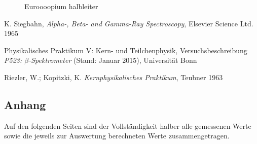 \documentclass[11pt, a4paper]{article}
\numberwithin{equation}{section}
\begin{document}
\begin{figure}[h]
	\centering
	
	\caption{Euroooopium halbleiter}
	\label{fig:halb_europium_spektrum}
\end{figure}

\FloatBarrier
\vspace{\fill}
\begin{thebibliography}{19}
	K. Siegbahn,
	\emph{Alpha-, Beta- and Gamma-Ray Spectroscopy},
	Elsevier Science Ltd. 1965

	Physikalisches Praktikum V: Kern- und Teilchenphysik,
	Versuchsbeschreibung \emph{P523: $\beta$-Spektrometer} (Stand: Januar 2015),
	Universität Bonn	

	Riezler, W.; Kopitzki, K.
	\emph{Kernphysikalisches Praktikum},
	Teubner 1963

\end{thebibliography}

\begin{appendix}
\section{Anhang}
Auf den folgenden Seiten sind der Vollständigkeit halber alle gemessenen Werte sowie die jeweils zur Auswertung berechneten Werte zusammengetragen.
\clearpage

\end{appendix}
\end{document}
